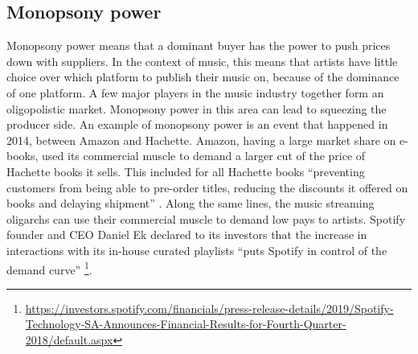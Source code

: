 \subsection{Monopsony power}
Monopsony power means that a dominant buyer has the power to push prices down with suppliers. In the context of music, this means that artists have little choice over which platform to publish their music on, because of the dominance of one platform. A few major players in the music industry together form an oligopolistic market. Monopsony power in this area can lead to squeezing the producer side. An example of monopsony power is an event that happened in 2014, between Amazon and Hachette. Amazon, having a large market share on e-books, used its commercial muscle to demand a larger cut of the price of Hachette books it sells. This included for all Hachette books ``preventing customers from being able to pre-order titles, reducing the discounts it offered on books and delaying shipment'' \citep{theguardian2014amazon}. Along the same lines, the music streaming oligarchs can use their commercial muscle to demand low pays to artists. Spotify founder and CEO Daniel Ek declared to its investors that the increase in interactions with its in-house curated playlists ``puts Spotify in control of the demand curve'' \footnote{\url{https://investors.spotify.com/financials/press-release-details/2019/Spotify-Technology-SA-Announces-Financial-Results-for-Fourth-Quarter-2018/default.aspx}}.
